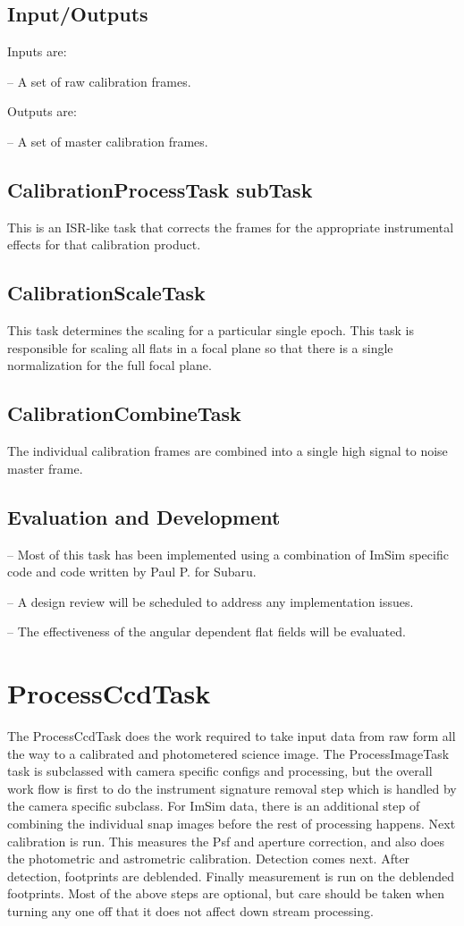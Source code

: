 \documentclass[12pt]{article}
\begin{document}
\subsection{Input/Outputs}
Inputs are:

-- A set of raw calibration frames.

Outputs are:

-- A set of master calibration frames.

\subsection{CalibrationProcessTask subTask}
This is an ISR-like task that corrects the frames for the appropriate instrumental effects for that calibration
product.

\subsection{CalibrationScaleTask}
This task determines the scaling for a particular single epoch.  This task is responsible for
scaling all flats in a focal plane so that there is a single normalization for the full focal plane.

\subsection{CalibrationCombineTask}
The individual calibration frames are combined into a single high signal to noise master frame. 

\subsection{Evaluation and Development}
-- Most of this task has been implemented using a combination of ImSim specific code and code written by Paul P. for Subaru.

-- A design review will be scheduled to address any implementation issues.

-- The effectiveness of the angular dependent flat fields will be evaluated.



\section{ProcessCcdTask\label{processccdsec}} 
The ProcessCcdTask does the work required to take input data from raw form all the way to a calibrated and
photometered science image.  The ProcessImageTask task is subclassed with camera specific configs and processing, but the overall 
work flow is first to do the instrument signature removal step which is handled by the camera specific subclass.  For ImSim
data, there is an additional step of combining the individual snap images before the rest of processing happens. Next calibration
is run.  This measures the Psf and aperture correction, and also does the photometric and astrometric calibration.  
Detection comes next.  After detection, footprints are deblended.
Finally measurement is run on the deblended footprints.  Most of the above steps are optional, but care should be taken
when turning any one off that it does not affect down stream processing.
\end{document}
